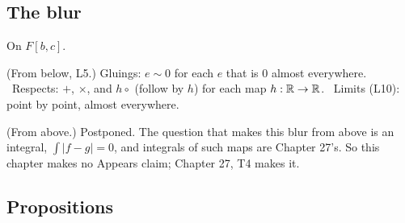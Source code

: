 \subsection*{The blur}

On $F[b,c]$.

\begin{lines}
\item[\lab{B1}] (From below, L5.) Gluings: $e \sim 0$ for each $e$ that is $0$ almost everywhere. \ Respects: $+$, $\times$, and $h \circ$ (follow by $h$) for each map $h : \mathbb{R} \to \mathbb{R}$. \ Limits (L10): point by point, almost everywhere.
\item[\lab{B2}] (From above.) Postponed. The question that makes this blur from above is an integral, $\int |f - g| = 0$, and integrals of such maps are Chapter 27's. So this chapter makes no Appears claim; Chapter 27, T4 makes it.
\end{lines}

\subsection*{Propositions}

